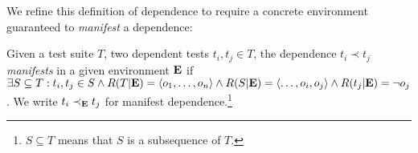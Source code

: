 %
%
%
%
%
%
%


We refine this definition of dependence to require a concrete environment guaranteed
to \emph{manifest} a dependence:
\begin{definition} \label{def:manifest}
Given a test suite\/ $T$, two dependent tests\/ $t_i, t_j \in T$,
the dependence\/ $t_i \prec t_j$ \emph{manifests} in a given
environment\/
$\mathbf{E}$ if\/ $\exists {S \subseteq T}: t_i, t_j \in S \wedge
R(T|\mathbf{E})
=  \langle o_1, \dots, o_n \rangle  \wedge R(S|\mathbf{E}) =
 \langle \dots,o_i,o_j \rangle  \wedge R(t_j|\mathbf{E}) = \neg o_j$. We
write\/ $t_i \prec_{\mathbf{E}} t_j$ for manifest dependence.\footnote{$S \subseteq T$ means that $S$ is a subsequence of
$T$.}
\end{definition}

